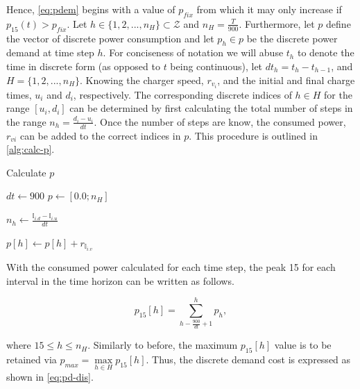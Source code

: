 \documentclass[11pt,a4paper,final]{article}
\newcommand{\I}{\mathbb{I}}                 %
\newcommand{\Hset}{H}                       %
\begin{document}
Hence, \ref{eq:pdem} begins with a value of \(p_{fix}\) from which it may only increase if \(p_{15}(t) > p_{fix}\). Let \(h \in \{ 1,
2, ..., n_H \} \subset \mathcal{Z}\) and \(n_H = \frac{T}{900}\). Furthermore, let \(p\) define the vector of discrete power consumption and
let \(p_h \in p\) be the discrete power demand at time step \(h\). For conciseness of notation we will abuse \(t_h\) to denote
the time in discrete form (as opposed to \(t\) being continuous), let \(dt_h = t_h - t_{h-1}\), and \(\Hset = \{ 1, 2, ...,
n_H \}\). Knowing the charger speed, \(r_{v_i}\), and the initial and final charge times, \(u_i\) and \(d_i\), respectively.
The corresponding discrete indices of \(h \in \Hset\) for the range \([u_i, d_i]\) can be determined by first calculating the
total number of steps in the range \(n_h = \frac{d_i - u_i}{dt}\). Once the number of steps are know, the consumed power,
\(r_{vi}\) can be added to the correct indices in \(p\). This procedure is outlined in \ref{alg:calc-p}.

\begin{algorithm}[H]
\caption{Calculate $p$} \label{alg:calc-p}
\LinesNumbered
{}
\KwIn{$(\I, r)$}

\Begin
{
  $dt \leftarrow 900$
  $p \leftarrow [0.0; n_H]$

  \ForEach {$\I_i \in \I$}
  {
    $n_h \leftarrow \frac{\I_{i.d} - \I_{i.u}}{dt}$

    {
      $p[h] \leftarrow p[h] + r_{\I_{i.v}}$
    }
  }
}
\end{algorithm}

With the consumed power calculated for each time step, the peak 15 for each interval in the time horizon can be written
as follows.

\begin{equation}
p_{15}[h] = \sum_{h-\frac{900}{dt}+1}^h p_h,
\end{equation}

where \(15 \le h \le n_H\). Similarly to before, the maximum \(p_{15}[h]\) value is to be retained via \(p_{max} = \max\limits_{h
\in H}p_{15}[h]\). Thus, the discrete demand cost is expressed as shown in \ref{eq:pd-dis}.
\end{document}
